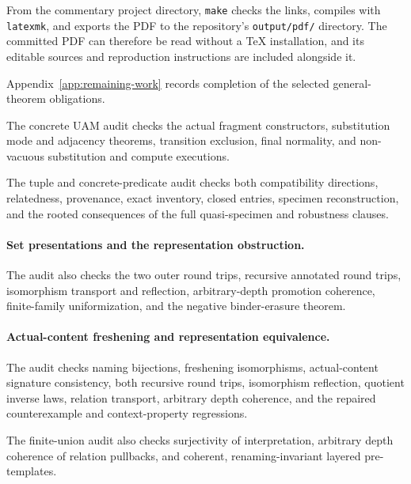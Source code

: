 From the commentary project directory, \texttt{make} checks the links, compiles
with \texttt{latexmk}, and exports the PDF to the repository's
\texttt{output/pdf/} directory. The committed PDF can therefore be read without
a TeX installation, and its editable sources and reproduction instructions are
included alongside it.

Appendix~\ref{app:remaining-work} records completion of the selected general-theorem obligations.

The concrete UAM audit checks the actual fragment constructors, substitution
mode and adjacency theorems, transition exclusion, final normality, and
non-vacuous substitution and compute executions.

The tuple and concrete-predicate audit checks both compatibility directions,
relatedness, provenance, exact inventory, closed entries, specimen reconstruction,
and the rooted consequences of the full quasi-specimen and robustness clauses.

\paragraph{Set presentations and the representation obstruction.}
The audit also checks the two outer round trips, recursive annotated round trips,
isomorphism transport and reflection, arbitrary-depth promotion coherence,
finite-family uniformization, and the negative binder-erasure theorem.

\paragraph{Actual-content freshening and representation equivalence.}
The audit checks naming bijections, freshening isomorphisms, actual-content
signature consistency, both recursive round trips, isomorphism reflection,
quotient inverse laws, relation transport, arbitrary depth coherence, and the
repaired counterexample and context-property regressions.

The finite-union audit also checks surjectivity of interpretation, arbitrary
depth coherence of relation pullbacks, and coherent, renaming-invariant
layered pre-templates.

